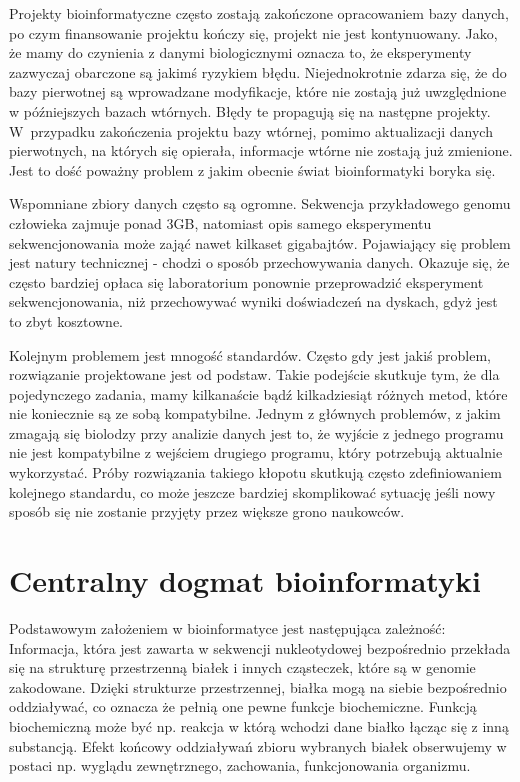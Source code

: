 Projekty bioinformatyczne często zostają zakończone opracowaniem bazy danych, po czym finansowanie projektu kończy się, projekt nie jest kontynuowany.
Jako, że mamy do czynienia z danymi biologicznymi oznacza to, że eksperymenty zazwyczaj obarczone są jakimś ryzykiem błędu. Niejednokrotnie zdarza się, że do bazy pierwotnej są wprowadzane modyfikacje, które nie zostają już uwzględnione w późniejszych bazach wtórnych. Błędy te propagują się na następne projekty. W~przypadku zakończenia projektu bazy wtórnej, pomimo aktualizacji danych pierwotnych, na których się opierała, informacje wtórne nie zostają już zmienione. Jest to dość poważny problem z jakim obecnie świat bioinformatyki boryka się.

Wspomniane zbiory danych często są ogromne. Sekwencja przykładowego genomu człowieka zajmuje ponad 3GB, natomiast opis samego eksperymentu sekwencjonowania może zająć nawet kilkaset gigabajtów. Pojawiający się problem jest natury technicznej - chodzi o sposób przechowywania danych. Okazuje się, że często bardziej opłaca się laboratorium ponownie przeprowadzić eksperyment sekwencjonowania, niż przechowywać wyniki doświadczeń na dyskach, gdyż jest to zbyt kosztowne. 

Kolejnym problemem jest mnogość standardów. Często gdy jest jakiś problem, rozwiązanie projektowane jest od podstaw. Takie podejście skutkuje tym, że dla pojedynczego zadania, mamy kilkanaście bądź kilkadziesiąt różnych metod, które nie koniecznie są ze sobą kompatybilne. Jednym z głównych problemów, z jakim zmagają się biolodzy przy analizie danych jest to, że wyjście z jednego programu nie jest kompatybilne z wejściem drugiego programu, który potrzebują aktualnie wykorzystać. Próby rozwiązania takiego kłopotu skutkują często zdefiniowaniem kolejnego standardu, co może jeszcze bardziej skomplikować sytuację jeśli nowy sposób się nie zostanie przyjęty przez większe grono naukowców.



\section{Centralny dogmat bioinformatyki}
Podstawowym założeniem w bioinformatyce jest następująca zależność:
Informacja, która jest zawarta w sekwencji nukleotydowej bezpośrednio przekłada się na strukturę przestrzenną białek i innych cząsteczek, które są w genomie zakodowane. Dzięki strukturze przestrzennej, białka mogą na siebie bezpośrednio oddziaływać, co oznacza że pełnią one pewne funkcje biochemiczne. Funkcją biochemiczną może być np. reakcja w którą wchodzi dane białko łącząc się z inną substancją. Efekt końcowy oddziaływań zbioru wybranych białek obserwujemy w postaci np. wyglądu zewnętrznego, zachowania, funkcjonowania organizmu.

